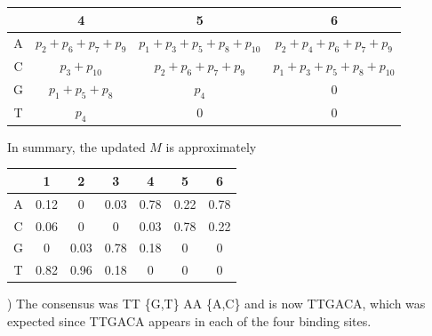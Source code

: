 \documentclass[a4paper,11pt]{article}
\begin{document}
\begin{table}[h!]
\begin{center}
\begin{tabular}{|c|c|c|c|}
\hline
 & 4 & 5 & 6\\
\hline
A & $p_2 + p_6 + p_7 + p_9$ & $p_1 + p_3 + p_5 + p_8 + p_{10}$ & $p_2 + p_4 + p_6 + p_7 + p_9$\\
\hline
C   & $p_3 + p_{10}$ & $p_2 + p_6 + p_7 + p_9$ & $p_1 + p_3 + p_5 + p_8 + p_{10}$ \\
\hline
G & $p_1 + p_5 + p_8$  & $p_4$ & 0\\
\hline
T  & $p_4$ & 0 & 0\\
 \hline
\end{tabular}
\end{center}
\end{table}

\noindent In summary, the updated $M$ is approximately 

\begin{table}[h!]
\begin{center}
\begin{tabular}{|c|c|c|c|c|c|c|}
\hline
 & 1 & 2 & 3 & 4 & 5 & 6\\
\hline
A & 0.12 & 0 & 0.03 &  0.78 & 0.22 & 0.78 \\
\hline
C & 0.06 & 0 & 0 & 0.03 & 0.78 & 0.22 \\
\hline
G & 0 & 0.03 & 0.78 & 0.18 & 0 & 0 \\
\hline
T & 0.82 & 0.96 & 0.18 & 0 & 0  & 0 \\
 \hline
\end{tabular}
\end{center}
\end{table}

) The consensus was TT \{G,T\} AA \{A,C\} and is now TTGACA, which was expected since TTGACA appears in each of the four binding sites. 
\end{document}
